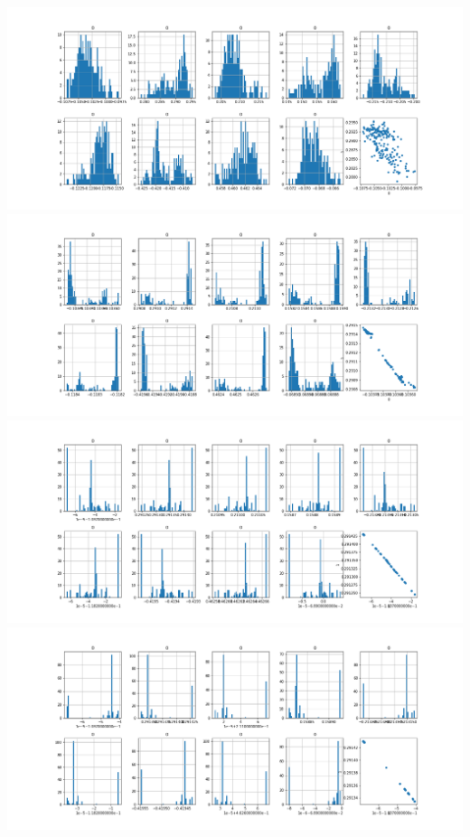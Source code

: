 \documentclass{article}
\begin{document}
\begin{center}

\includegraphics[width=\linewidth]{200_10_0_9_8.png}
\includegraphics[width=\linewidth]{200_10_0_9_18.png}
\includegraphics[width=\linewidth]{200_10_0_9_28.png}
\includegraphics[width=\linewidth]{200_10_0_9_38.png}

\end{center}
\end{document}

